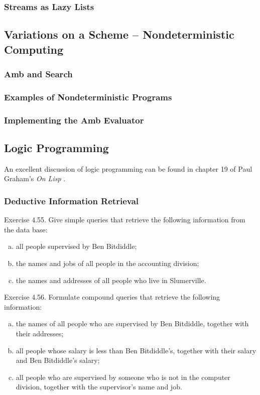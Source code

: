             \subsubsection{Streams as Lazy Lists}
        \subsection{Variations on a Scheme -- Nondeterministic Computing}
            \subsubsection{Amb and Search}
            \subsubsection{Examples of Nondeterministic Programs}
            \subsubsection{Implementing the Amb Evaluator}
        \subsection{Logic Programming}
An excellent discussion of logic programming can be found in chapter 19 of Paul Graham's \emph{On Lisp} \cite{Graham}.
            \subsubsection{Deductive Information Retrieval}
Exercise 4.55.  Give simple queries that retrieve the following information from the data base:
\begin{enumerate}[(a)]
\item all people supervised by Ben Bitdiddle;
\item the names and jobs of all people in the accounting division;
\item the names and addresses of all people who live in Slumerville.
\end{enumerate}
Exercise 4.56.  Formulate compound queries that retrieve the following information:
\begin{enumerate}[(a)]
\item the names of all people who are supervised by Ben Bitdiddle, together with their addresses;
\item all people whose salary is less than Ben Bitdiddle's, together with their salary and Ben Bitdiddle's salary;
\item all people who are supervised by someone who is not in the computer division, together with the supervisor's name and job.
\end{enumerate}
